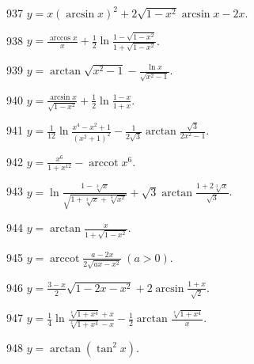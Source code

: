 \begin{prob}[S]{937}
$y = x(\arcsin x)^2 + 2\sqrt{1 - x^2} \arcsin x - 2x$.
\end{prob}

\begin{prob}[S]{938}
$y = \frac{\arccos x}{x} + \frac{1}{2} \ln \frac{1 - \sqrt{1 - x^2}}{1 + \sqrt{1 - x^2}}$.
\end{prob}

\begin{prob}[S]{939}
$y = \arctan \sqrt{x^2 - 1} - \frac{\ln x}{\sqrt{x^2 - 1}}$.
\end{prob}

\begin{prob}[S]{940}
$y = \frac{\arcsin x}{\sqrt{1 - x^2}} + \frac{1}{2} \ln \frac{1 - x}{1 + x}$.
\end{prob}

\begin{prob}[S]{941}
$y = \frac{1}{12} \ln \frac{x^4 - x^2 + 1}{(x^2 + 1)^2} - \frac{1}{2\sqrt{3}} \arctan \frac{\sqrt{3}}{2x^2 - 1}$.
\end{prob}

\begin{prob}[S]{942}
$y = \frac{x^6}{1 + x^{12}} - \operatorname{arccot} x^6$.
\end{prob}

\begin{prob}[S]{943}
$y = \ln \frac{1 - \sqrt[3]{x}}{\sqrt{1 + \sqrt[3]{x} + \sqrt[3]{x^2}}} + \sqrt{3} \arctan \frac{1 + 2\sqrt[3]{x}}{\sqrt{3}}$.
\end{prob}

\begin{prob}[S]{944}
$y = \arctan \frac{x}{1 + \sqrt{1 - x^2}}$.
\end{prob}

\begin{prob}[S]{945}
$y = \operatorname{arccot} \frac{a - 2x}{2\sqrt{ax - x^2}} \ (a > 0)$.
\end{prob}

\begin{prob}[S]{946}
$y = \frac{3 - x}{2} \sqrt{1 - 2x - x^2} + 2\arcsin \frac{1 + x}{\sqrt{2}}$.
\end{prob}

\begin{prob}[S]{947}
$y = \frac{1}{4} \ln \frac{\sqrt[4]{1 + x^4} + x}{\sqrt[4]{1 + x^4} - x} - \frac{1}{2} \arctan \frac{\sqrt[4]{1 + x^4}}{x}$.
\end{prob}

\begin{prob}[S]{948}
$y = \arctan(\tan^2 x)$.
\end{prob}


